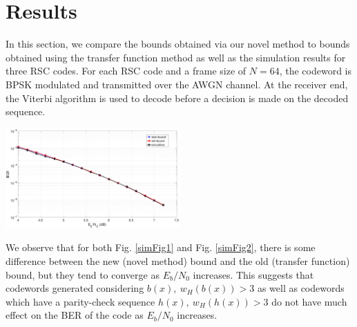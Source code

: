 \section{Results}
\label{sec5}
In this section, we compare the bounds obtained via our novel method to bounds obtained using the transfer function method as well as the simulation results for three RSC codes. For each RSC code and a frame size of $N=64$, the codeword is BPSK modulated and transmitted over the AWGN channel. At the receiver end, the Viterbi algorithm is used to decode before a decision is made on the decoded sequence.


\begin{minipage}{\textwidth}
\centering
		\includegraphics[width=0.5\textwidth]{./Images/RSC_5_7_lower_weights.eps}
		\label{simFig1}
		\end{minipage}
		
We observe that for both Fig. \ref{simFig1} and Fig. \ref{simFig2}, there is some difference between the new (novel method) bound and the old (transfer function) bound, but they tend to converge as $E_b/N_0$ increases. This suggests that codewords generated considering $b(x),~w_H(b(x))>3$ as well as codewords which have a parity-check sequence $h(x),~w_H(h(x))>3$ do not have much effect on the BER of the code as $E_b/N_0$ increases.


